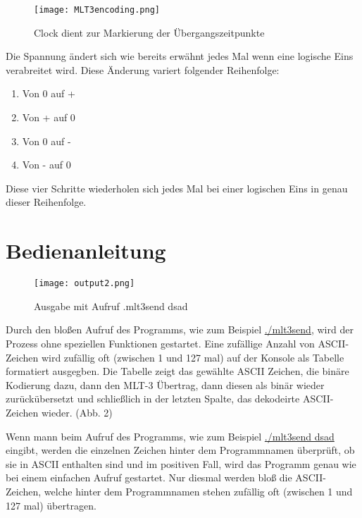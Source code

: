 \documentclass{article}
\begin{document}
\begin{center}
\begin{figure}[h]
    \centering
    \texttt{[image: MLT3encoding.png]}
    \caption{Clock dient zur Markierung der Übergangszeitpunkte}
\end{figure}
\end{center}
\break

Die Spannung ändert sich wie bereits erwähnt jedes Mal wenn eine logische Eins verabreitet wird. Diese Änderung variert folgender
Reihenfolge:

\begin{enumerate}
	\item Von 0 auf +
	\item Von + auf 0
	\item Von 0 auf -
	\item Von - auf 0
\end{enumerate}

Diese vier Schritte wiederholen sich jedes Mal bei einer logischen Eins in genau dieser Reihenfolge.

\section{Bedienanleitung}

\begin{center}
\begin{figure}[h]
    \centering
    \texttt{[image: output2.png]}
    \caption{Ausgabe mit Aufruf .mlt3send dsad}
\end{figure}
\end{center}

Durch den bloßen Aufruf des Programms, wie zum Beispiel \underline{./mlt3send}, wird der Prozess ohne speziellen Funktionen
gestartet. Eine zufällige Anzahl von ASCII-Zeichen wird zufällig oft (zwischen 1 und 127 mal) auf der Konsole als Tabelle formatiert ausgegben.
Die Tabelle zeigt das gewählte ASCII Zeichen, die binäre Kodierung dazu, dann den MLT-3 Übertrag, dann diesen als binär wieder zurückübersetzt
und schließlich in der letzten Spalte, das dekodeirte ASCII-Zeichen wieder. (Abb. 2)

Wenn mann beim Aufruf des Programms, wie zum Beispiel  \underline{./mlt3send dsad} eingibt, werden die einzelnen Zeichen hinter dem Programmnamen
überprüft, ob sie in ASCII enthalten sind und im positiven Fall, wird das Programm genau wie bei einem einfachen Aufruf gestartet. Nur diesmal werden
bloß die ASCII-Zeichen, welche hinter dem Programmnamen stehen zufällig oft (zwischen 1 und 127 mal) übertragen. \\
\end{document}
